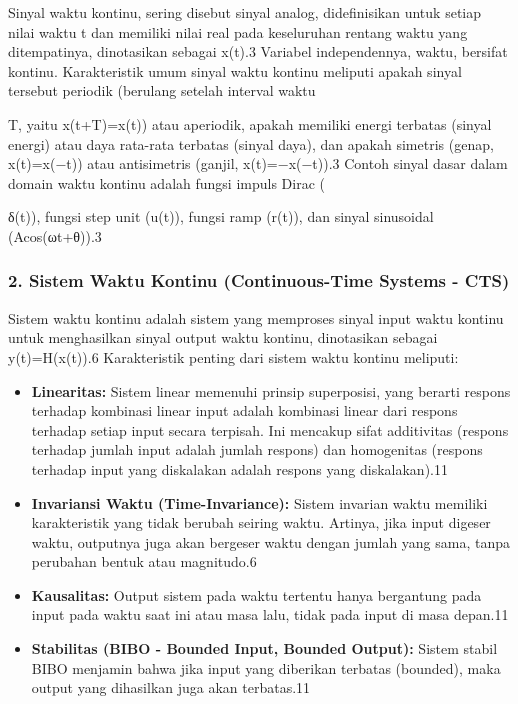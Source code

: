 \documentclass[
  letterpaper,
  DIV=11,
  numbers=noendperiod]{scrreprt}
\begin{document}
Sinyal waktu kontinu, sering disebut sinyal analog, didefinisikan untuk
setiap nilai waktu t dan memiliki nilai real pada keseluruhan rentang
waktu yang ditempatinya, dinotasikan sebagai x(t).3 Variabel
independennya, waktu, bersifat kontinu. Karakteristik umum sinyal waktu
kontinu meliputi apakah sinyal tersebut periodik (berulang setelah
interval waktu

T, yaitu x(t+T)=x(t)) atau aperiodik, apakah memiliki energi terbatas
(sinyal energi) atau daya rata-rata terbatas (sinyal daya), dan apakah
simetris (genap, x(t)=x(−t)) atau antisimetris (ganjil, x(t)=−x(−t)).3
Contoh sinyal dasar dalam domain waktu kontinu adalah fungsi impuls
Dirac (

δ(t)), fungsi step unit (u(t)), fungsi ramp (r(t)), dan sinyal
sinusoidal (Acos(ωt+θ)).3

\subsubsection{2. Sistem Waktu Kontinu (Continuous-Time Systems -
CTS)}\label{sistem-waktu-kontinu-continuous-time-systems---cts}

Sistem waktu kontinu adalah sistem yang memproses sinyal input waktu
kontinu untuk menghasilkan sinyal output waktu kontinu, dinotasikan
sebagai y(t)=H(x(t)).6 Karakteristik penting dari sistem waktu kontinu
meliputi:

\begin{itemize}
\item
  \textbf{Linearitas:} Sistem linear memenuhi prinsip superposisi, yang
  berarti respons terhadap kombinasi linear input adalah kombinasi
  linear dari respons terhadap setiap input secara terpisah. Ini
  mencakup sifat additivitas (respons terhadap jumlah input adalah
  jumlah respons) dan homogenitas (respons terhadap input yang
  diskalakan adalah respons yang diskalakan).11
\item
  \textbf{Invariansi Waktu (Time-Invariance):} Sistem invarian waktu
  memiliki karakteristik yang tidak berubah seiring waktu. Artinya, jika
  input digeser waktu, outputnya juga akan bergeser waktu dengan jumlah
  yang sama, tanpa perubahan bentuk atau magnitudo.6
\item
  \textbf{Kausalitas:} Output sistem pada waktu tertentu hanya
  bergantung pada input pada waktu saat ini atau masa lalu, tidak pada
  input di masa depan.11
\item
  \textbf{Stabilitas (BIBO - Bounded Input, Bounded Output):} Sistem
  stabil BIBO menjamin bahwa jika input yang diberikan terbatas
  (bounded), maka output yang dihasilkan juga akan terbatas.11
\end{itemize}
\end{document}
